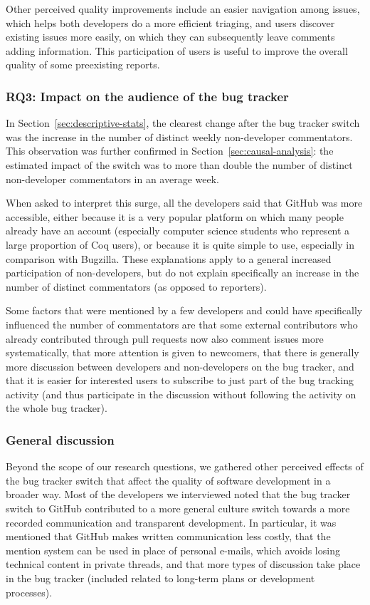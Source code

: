 Other perceived quality improvements include an easier navigation among issues, which helps both developers do a more efficient triaging, and users discover existing issues more easily, on which they can subsequently leave comments adding information. This participation of users is useful to improve the overall quality of some preexisting reports.

\subsubsection{RQ3: Impact on the audience of the bug tracker}

In Section~\ref{sec:descriptive-stats}, the clearest change after the bug tracker switch was the increase in the number of distinct weekly non-developer commentators.
This observation was further confirmed in Section~\ref{sec:causal-analysis}: the estimated impact of the switch was to more than double the number of distinct non-developer commentators in an average week.

When asked to interpret
this surge,
all the developers said that GitHub was more accessible, either because it is a very popular platform on which many people already have an account (especially computer science students who represent a large proportion of Coq users), or because it is quite simple to use, especially in comparison with Bugzilla. These explanations apply to a general increased participation of non-developers, but do not explain specifically an increase in the number of distinct commentators (as opposed to reporters).

Some factors that were mentioned by a few developers and could have specifically influenced the number of commentators are that some external contributors who already contributed through pull requests now also comment issues more systematically, that more attention is given to newcomers, that there is generally more discussion between developers and non-developers on the bug tracker, and that it is easier for interested users to subscribe to just part of the bug tracking activity (and thus participate in the discussion without following the activity on the whole bug tracker).

\subsubsection{General discussion}

Beyond the scope of our research questions, we gathered other perceived effects of the bug tracker switch that affect the quality of software development in a broader way.
Most of the developers we interviewed noted that the bug tracker switch to GitHub contributed to a more general culture switch towards a more recorded communication and transparent development.
In particular, it was mentioned that GitHub makes written communication less costly, that the mention system can be used in place of personal e-mails, which avoids losing technical content in private threads, and that more types of discussion take place in the bug tracker (included related to long-term plans or development processes).

